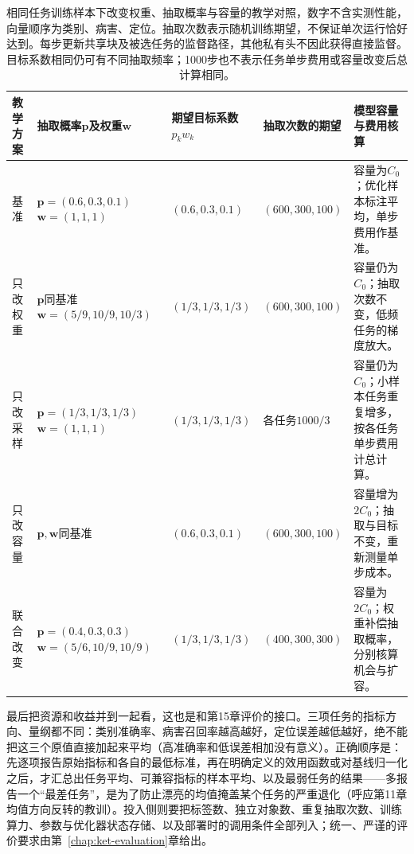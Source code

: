 \begin{table}[htbp]
  \centering
  \small
  \begin{tabularx}{\linewidth}{p{18mm}p{36mm}p{25mm}p{28mm}X}
    \toprule
    教学方案 & 抽取概率$\bm p$及权重$\bm w$ & 期望目标系数$p_kw_k$ & 抽取次数的期望 & 模型容量与费用核算 \\
    \midrule
    基准 &
    $\bm p=(0.6,0.3,0.1)$\newline
    $\bm w=(1,1,1)$ &
    $(0.6,0.3,0.1)$ &
    $(600,300,100)$ &
    容量为$C_0$；优化样本标注平均，单步费用作基准。 \\
    只改权重 &
    $\bm p$同基准\newline
    $\bm w=(5/9,10/9,10/3)$ &
    $(1/3,1/3,1/3)$ &
    $(600,300,100)$ &
    容量仍为$C_0$；抽取次数不变，低频任务的梯度放大。 \\
    只改采样 &
    $\bm p=(1/3,1/3,1/3)$\newline
    $\bm w=(1,1,1)$ &
    $(1/3,1/3,1/3)$ &
    各任务$1000/3$ &
    容量仍为$C_0$；小样本任务重复增多，按各任务单步费用计总计算。 \\
    只改容量 &
    $\bm p,\bm w$同基准 &
    $(0.6,0.3,0.1)$ &
    $(600,300,100)$ &
    容量增为$2C_0$；抽取与目标不变，重新测量单步成本。 \\
    联合改变 &
    $\bm p=(0.4,0.3,0.3)$\newline
    $\bm w=(5/6,10/9,10/9)$ &
    $(1/3,1/3,1/3)$ &
    $(400,300,300)$ &
    容量为$2C_0$；权重补偿抽取概率，分别核算机会与扩容。 \\
    \bottomrule
  \end{tabularx}
  \caption{相同任务训练样本下改变权重、抽取概率与容量的教学对照，数字不含实测性能，向量顺序为类别、病害、定位。抽取次数表示随机训练期望，不保证单次运行恰好达到。每步更新共享块及被选任务的监督路径，其他私有头不因此获得直接监督。目标系数相同仍可有不同抽取频率；1000步也不表示任务单步费用或容量改变后总计算相同。}
  \label{tab:ket-sharing-resource-controls}
\end{table}

最后把资源和收益并到一起看，这也是和第15章评价的接口。三项任务的指标方向、量纲都不同：类别准确率、病害召回率越高越好，定位误差越低越好，绝不能把这三个原值直接加起来平均（高准确率和低误差相加没有意义）。正确顺序是：先逐项报告原始指标和各自的最低标准，再在明确定义的效用函数或对基线归一化之后，才汇总出任务平均、可兼容指标的样本平均、以及最弱任务的结果——多报告一个“最差任务”，是为了防止漂亮的均值掩盖某个任务的严重退化（呼应第11章均值方向反转的教训）。投入侧则要把标签数、独立对象数、重复抽取次数、训练算力、参数与优化器状态存储、以及部署时的调用条件全部列入；统一、严谨的评价要求由第~\ref{chap:ket-evaluation}章给出。

